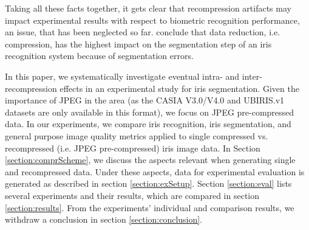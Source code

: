 \documentclass[10pt,twocolumn,letterpaper]{article}
\begin{document}
	Taking all these facts together, it gets clear that recompression artifacts may impact experimental results with respect to biometric recognition
	performance, an issue, that has been neglected so far. \cite{severeCompression, BDaugman08a} conclude that data reduction, i.e. compression, has the highest impact on the segmentation step of an iris recognition system because of segmentation errors.
	
	In this paper, we systematically investigate eventual intra- and inter-recompression effects 
	in an experimental study for iris segmentation. Given the importance of JPEG in the area (as the CASIA V3.0/V4.0 and UBIRIS.v1 datasets are only available in this format), we 
	focus on JPEG pre-compressed data. In our experiments, we compare iris recognition, iris segmentation, and general purpose image quality metrics applied
	to single compressed vs. recompressed (i.e. JPEG pre-compressed) iris image data. In Section \ref{section:comprScheme}, we discuss the aspects relevant when generating single and recompressed data. Under these aspects, data for experimental evaluation is generated as described in section \ref{section:exSetup}. Section \ref{section:eval} lists several experiments and their results, which are compared in section \ref{section:results}. From the experiments' individual and comparison results, we withdraw a conclusion in section \ref{section:conclusion}.
	
\end{document}
